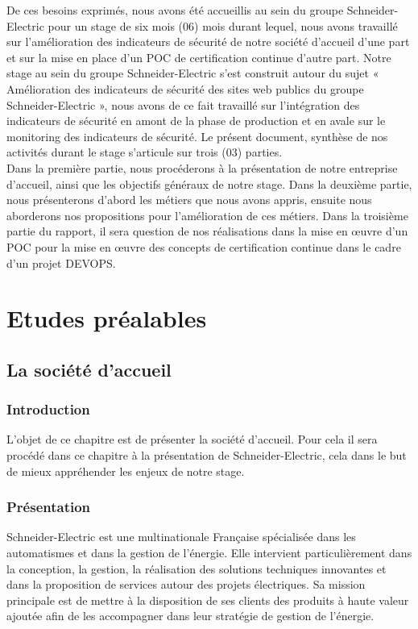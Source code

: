 \documentclass[a4paper,12pt]{book}
\theoremstyle{break}
\begin{document}
De ces besoins exprimés, nous avons été accueillis au sein du groupe Schneider-Electric pour un stage de six mois (06) mois durant lequel, nous avons travaillé sur l’amélioration des indicateurs de sécurité de notre société d'accueil d'une part et sur la mise en place d'un \ac{POC} de certification continue d'autre part. 
\newline Notre stage au sein du groupe Schneider-Electric s’est construit autour du sujet « Amélioration des indicateurs de sécurité des sites web publics du groupe Schneider-Electric », nous avons de ce fait travaillé sur l’intégration des indicateurs de sécurité en amont de la phase de production et en avale sur le monitoring des indicateurs de sécurité. 
\newline Le présent document, synthèse de nos activités durant le stage s’articule sur trois (03) parties. \\
Dans la première partie, nous procéderons à la présentation de notre entreprise d’accueil, ainsi que les objectifs généraux de notre stage. 
\newline
Dans la deuxième partie, nous présenterons d'abord les métiers que nous avons appris, ensuite nous aborderons nos propositions pour l'amélioration de ces métiers.
\newline
Dans la troisième partie du rapport, il sera question de nos réalisations dans la mise en  œuvre d'un POC pour la mise en  œuvre des concepts de certification continue dans le cadre d'un projet \ac{DEVOPS}.

\part{Etudes préalables }
\chapter{La société d'accueil}
\section*{Introduction}
L'objet de ce chapitre est de présenter la société d'accueil. Pour cela il sera procédé dans ce chapitre à la présentation de Schneider-Electric, cela dans le but de mieux appréhender les enjeux de notre stage. 

\section{Présentation}
Schneider-Electric est une multinationale Française spécialisée dans les automatismes et dans la gestion de l’énergie.\newline 
Elle intervient particulièrement dans la conception, la gestion, la réalisation des solutions techniques innovantes et dans la proposition de services autour des projets électriques. \newline
Sa mission principale est de mettre à la disposition de ses clients des produits à haute valeur ajoutée afin de les accompagner dans leur stratégie de gestion de l’énergie.\newline
\end{document}
